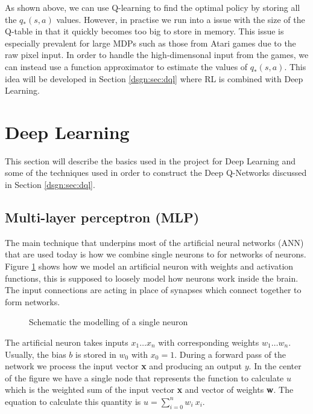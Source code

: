 

As shown above, we can use Q-learning to find the optimal policy by storing all the $q_*(s, a)$ values. However, in practise we run into a issue with the size of the Q-table in that it quickly becomes too big to store in memory. This issue is especially prevalent for large MDPs such as those from Atari games due to the raw pixel input. In order to handle the high-dimensonal input from the games, we can instead use a function approximator to estimate the values of $q_*(s, a)$. This idea will be developed in Section \ref{dsgn:sec:dql} where RL is combined with Deep Learning.

\section{Deep Learning}
\label{dsgn:sec:dl}
This section will describe the basics used in the project for Deep Learning and some of the techniques used in order to construct the Deep Q-Networks discussed in Section \ref{dsgn:sec:dql}.

\subsection{Multi-layer perceptron (MLP)}
\label{dsgn:sec:dl:mlp}
The main technique that underpins most of the artificial neural networks (ANN) that are used today is how we combine single neurons to for networks of neurons. Figure \ref{fig:neuron} shows how we model an artificial neuron with weights and activation functions, this is supposed to loosely model how neurons work inside the brain. The input connections are acting in place of synapses which connect together to form networks.

\begin{figure}[ht!]
	\centering
	
	\caption{Schematic the modelling of a single neuron} \label{fig:neuron}
\end{figure}

The artificial neuron takes inputs $x_1 \hdots x_n$ with corresponding weights $w_1 \hdots w_n$. Usually, the bias $b$ is stored in $w_0$ with $x_0 = 1$. During a forward pass of the network we process the input vector \textbf{x} and producing an output $y$. In the center of the figure we have a single node that represents the function to calculate $u$ which is the weighted sum of the input vector \textbf{x} and vector of weights \textbf{w}. The equation to calculate this quantity is $u = \sum_{i=0}^n w_i~x_i$.

